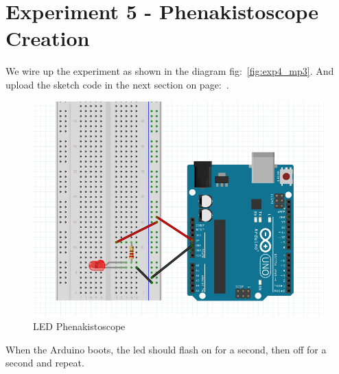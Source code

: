 \chapter*{Experiment 5 - Phenakistoscope Creation}
We wire up the experiment as shown in the diagram fig:~\ref{fig:exp4_mp3}. And upload the sketch code in the next section on page:~\pageref{sketch:exp4}.

%
\begin{figure}[ht]
	\centering
	\includegraphics[width=12cm]{images/07}
	\caption{LED Phenakistoscope \citep{fritzing-15}}
	\label{fig:exp5_phenakistoscope}
\end{figure}
%

When the Arduino boots, the led should flash on for a second, then off for a second and repeat.


